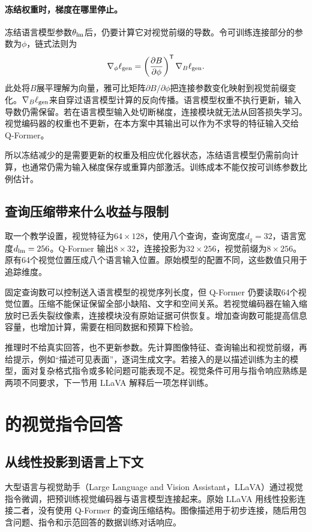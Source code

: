 \paragraph{冻结权重时，梯度在哪里停止。}
冻结语言模型参数$\theta_{\rm lm}$后，仍要计算它对视觉前缀的导数。令可训练连接部分的参数为$\phi$，链式法则为
\begin{equation}
 \nabla_\phi\ell_{\rm gen}
 =\left(\frac{\partial B}{\partial\phi}\right)^{\mathsf T}
 \nabla_B\ell_{\rm gen}.
\end{equation}
此处将$B$展平理解为向量，雅可比矩阵$\partial B/\partial\phi$把连接参数变化映射到视觉前缀变化。$\nabla_B\ell_{\rm gen}$来自穿过语言模型计算的反向传播。语言模型权重不执行更新，输入导数仍需保留。若在语言模型输入处切断梯度，连接模块就无法从回答损失学习。视觉编码器的权重也不更新，在本方案中其输出可以作为不求导的特征输入交给 Q-Former。

所以冻结减少的是需要更新的权重及相应优化器状态，冻结语言模型仍需前向计算，也通常仍需为输入梯度保存或重算内部激活。训练成本不能仅按可训练参数比例估计。

\subsection{查询压缩带来什么收益与限制}
取一个教学设置，视觉特征为$64\times128$，使用八个查询，查询宽度$d_q=32$，语言宽度$d_{\rm lm}=256$。Q-Former 输出$8\times32$，连接投影为$32\times256$，视觉前缀为$8\times256$。原有64个视觉位置压成八个语言输入位置。原始模型的配置不同，这些数值只用于追踪维度。

固定查询数可以控制送入语言模型的视觉序列长度，但 Q-Former 仍要读取64个视觉位置。压缩不能保证保留全部小缺陷、文字和空间关系。若视觉编码器在输入缩放时已丢失裂纹像素，连接模块没有原始证据可供恢复。增加查询数可能提高信息容量，也增加计算，需要在相同数据和预算下检验。

推理时不给真实回答，也不更新参数。先计算图像特征、查询输出和视觉前缀，再给提示，例如“描述可见表面”，逐词生成文字。若接入的是以描述训练为主的模型，面对复杂格式指令或多轮问题可能表现不足。视觉条件可用与指令响应熟练是两项不同要求，下一节用 LLaVA 解释后一项怎样训练。

\section{\texorpdfstring{}{LLaVA} 的视觉指令回答}
\subsection{从线性投影到语言上下文}
大型语言与视觉助手（Large Language and Vision Assistant，LLaVA）通过视觉指令微调，把预训练视觉编码器与语言模型连接起来。原始 LLaVA 用线性投影连接二者，没有使用 Q-Former 的查询压缩结构。图像描述用于初步连接，随后用包含问题、指令和示范回答的数据训练对话响应。

